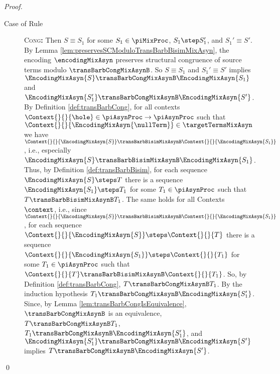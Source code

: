 \documentclass[]{llncs}
\begin{document}
\begin{proof}
\begin{description}
\begin{description}
				\item[Case of Rule] \textsc{Cong}\textbf{:} Then $ S \equiv S_1 $ for some $ S_1 \in \piMixProc $, $ S_1 \step S_1' $, and $ S_1' \equiv S' $. By Lemma \ref{lem:preservesSCModuloTransBarbBisimMixAsyn}, the encoding $ \encodingMixAsyn $ preserves structural congruence of source terms modulo $ \transBarbCongMixAsynB $. So $ S \equiv S_1 $ and $ S_1' \equiv S' $ implies $ \EncodingMixAsyn{S} \transBarbCongMixAsynB \EncodingMixAsyn{S_1} $ and $ \EncodingMixAsyn{S_1'} \transBarbCongMixAsynB \EncodingMixAsyn{S'} $. By Definition \ref{def:transBarbCong}, for all contexts $ \Context{}{}{\hole} \in \piAsynProc \to \piAsynProc $ such that $ \Context{}{}{\EncodingMixAsyn{\nullTerm}} \in \targetTermsMixAsyn $ we have $ \Context{}{}{\EncodingMixAsyn{S}} \transBarbBisimMixAsynB \Context{}{}{\EncodingMixAsyn{S_1}} $, i.e., especially $ \EncodingMixAsyn{S} \transBarbBisimMixAsynB \EncodingMixAsyn{S_1} $. Thus, by Definition \ref{def:transBarbBisim}, for each sequence $ \EncodingMixAsyn{S} \steps T $ there is a sequence $ \EncodingMixAsyn{S_1} \steps T_1 $ for some $ T_1 \in \piAsynProc $ such that $ T \transBarbBisimMixAsynB T_1 $. The same holds for all Contexts $ \context $, i.e., since $ \Context{}{}{\EncodingMixAsyn{S}} \transBarbBisimMixAsynB \Context{}{}{\EncodingMixAsyn{S_1}} $, for each sequence $ \Context{}{}{\EncodingMixAsyn{S}} \steps \Context{}{}{T} $ there is a sequence $ \Context{}{}{\EncodingMixAsyn{S_1}} \steps \Context{}{}{T_1} $ for some $ T_1 \in \piAsynProc $ such that $ \Context{}{}{T} \transBarbBisimMixAsynB \Context{}{}{T_1} $. So, by Definition \ref{def:transBarbCong}, $ T \transBarbCongMixAsynB T_1 $. By the induction hypothesis $ T_1 \transBarbCongMixAsynB \EncodingMixAsyn{S_1'} $. Since, by Lemma \ref{lem:transBarbCongIsEquivalence}, $ \transBarbCongMixAsynB $ is an equivalence, $ T \transBarbCongMixAsynB T_1 $, $ T_1 \transBarbCongMixAsynB \EncodingMixAsyn{S_1'} $, and $ \EncodingMixAsyn{S_1'} \transBarbCongMixAsynB \EncodingMixAsyn{S'} $ implies $ T \transBarbCongMixAsynB \EncodingMixAsyn{S'} $.
			\end{description}
	\end{description}
	\qed
\end{proof}
\end{document}
